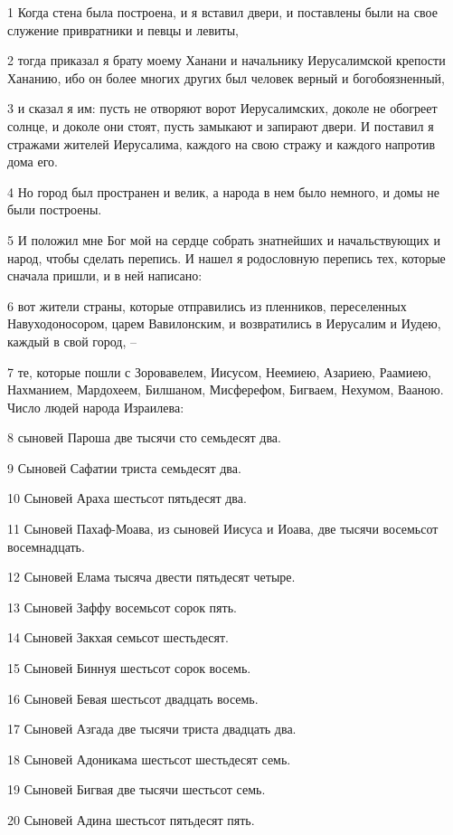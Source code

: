 \par 1 Когда стена была построена, и я вставил двери, и поставлены были на свое служение привратники и певцы и левиты,
\par 2 тогда приказал я брату моему Ханани и начальнику Иерусалимской крепости Хананию, ибо он более многих других был человек верный и богобоязненный,
\par 3 и сказал я им: пусть не отворяют ворот Иерусалимских, доколе не обогреет солнце, и доколе они стоят, пусть замыкают и запирают двери. И поставил я стражами жителей Иерусалима, каждого на свою стражу и каждого напротив дома его.
\par 4 Но город был пространен и велик, а народа в нем было немного, и домы не были построены.
\par 5 И положил мне Бог мой на сердце собрать знатнейших и начальствующих и народ, чтобы сделать перепись. И нашел я родословную перепись тех, которые сначала пришли, и в ней написано:
\par 6 вот жители страны, которые отправились из пленников, переселенных Навуходоносором, царем Вавилонским, и возвратились в Иерусалим и Иудею, каждый в свой город, --
\par 7 те, которые пошли с Зоровавелем, Иисусом, Неемиею, Азариею, Раамиею, Нахманием, Мардохеем, Билшаном, Мисферефом, Бигваем, Нехумом, Вааною. Число людей народа Израилева:
\par 8 сыновей Пароша две тысячи сто семьдесят два.
\par 9 Сыновей Сафатии триста семьдесят два.
\par 10 Сыновей Араха шестьсот пятьдесят два.
\par 11 Сыновей Пахаф-Моава, из сыновей Иисуса и Иоава, две тысячи восемьсот восемнадцать.
\par 12 Сыновей Елама тысяча двести пятьдесят четыре.
\par 13 Сыновей Заффу восемьсот сорок пять.
\par 14 Сыновей Закхая семьсот шестьдесят.
\par 15 Сыновей Биннуя шестьсот сорок восемь.
\par 16 Сыновей Бевая шестьсот двадцать восемь.
\par 17 Сыновей Азгада две тысячи триста двадцать два.
\par 18 Сыновей Адоникама шестьсот шестьдесят семь.
\par 19 Сыновей Бигвая две тысячи шестьсот семь.
\par 20 Сыновей Адина шестьсот пятьдесят пять.
